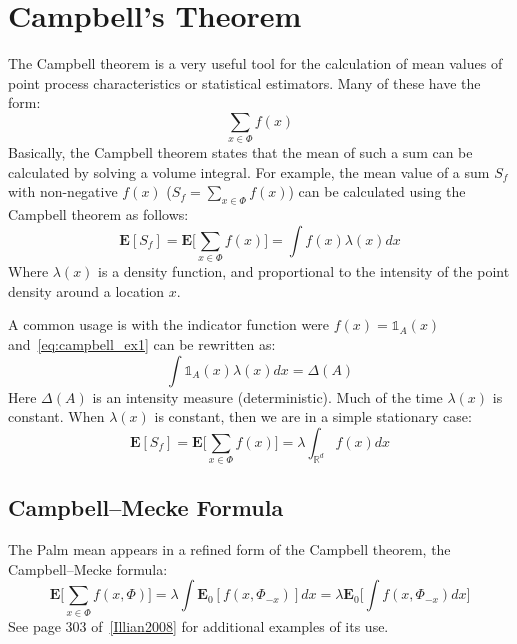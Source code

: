 \section{Campbell's Theorem}\label{app:campbell}
%
The Campbell theorem is a very useful tool for the calculation of mean values of point process characteristics or statistical estimators. Many of these have the form:
%
\begin{equation}
  \sum_{x \in \Phi} f(x)
\end{equation}
%
Basically, the Campbell theorem states that the mean of such a sum can be calculated by solving a volume integral.  For example, the mean value of a sum $S_f$ with non-negative $f(x)$ ($S_f = \sum_{x \in \Phi} f(x)$) can be calculated using the Campbell theorem as follows:
\begin{equation}\label{eq:campbell_ex1}
  \textbf{E}[S_f] = \textbf{E}\Big[ \sum_{x \in \Phi} f(x) \Big] = \int f(x) \lambda(x) dx
\end{equation}
%
Where $\lambda(x)$ is a density function, and proportional to the intensity of the point density around a location $x$.
\par
%
A common usage is with the indicator function were $f(x) = \mathbb{1}_\textit{A}(x)$ and~\eqref{eq:campbell_ex1} can be rewritten as:
\begin{equation}
  \int \mathbb{1}_\textit{A}(x) \lambda(x) dx = \Delta(\textit{A})
\end{equation}
%
Here $\Delta(\textit{A})$ is an intensity measure (deterministic).  Much of the time $\lambda(x)$ is constant.  When $\lambda(x)$ is constant, then we are in a simple stationary case:
%
\begin{equation}\label{eq:campbell_stationary}
  \textbf{E}[S_f] = \textbf{E}\Big[ \sum_{x \in \Phi} f(x) \Big] = \lambda \int_{\mathbb{R}^d} f(x) dx
\end{equation}
%
\subsection{Campbell–Mecke Formula}
The Palm mean appears in a refined form of the Campbell theorem, the Campbell–Mecke formula:
%
\begin{equation}\label{eq:campbell_mecke}
  \textbf{E}\Big[ \sum_{x \in \Phi} f(x,\Phi) \Big] = \lambda \int \textbf{E}_0 [f(x,\Phi_{-x})] dx = \lambda \textbf{E}_0 \Big[ \int f(x,\Phi_{-x}) dx \Big]
\end{equation}
%
See page 303 of~\ref{Illian2008} for additional examples of its use.
%
